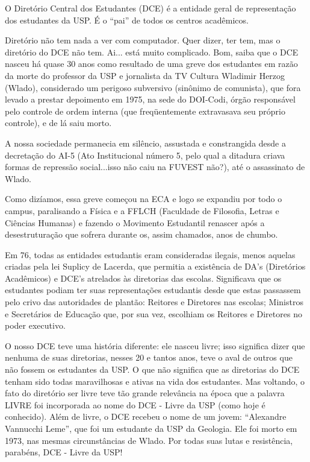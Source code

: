 \documentclass[11pt]{report}
\newenvironment{secao}[1] {
    \framebox[\textwidth] {
        \rule[-1.2ex]{5ex}{5.5ex}
        {\Large\sf #1}
        \hspace{\stretch{1}}
    } \addcontentsline{toc}{chapter}{#1}
    \nopagebreak[4]
} { 
}
\begin{document}
\begin{secao}{Um Pouco Sobre o DCE}


O Diretório Central dos Estudantes (DCE) é a entidade geral de representação
dos estudantes da USP. É o ``pai'' de todos os centros acadêmicos.

Diretório não tem nada a ver com computador. Quer dizer, ter tem, mas o
diretório do DCE não tem. Ai... está muito complicado. Bom, saiba que o DCE
nasceu há quase 30 anos como resultado de uma greve dos estudantes em
razão da morte do professor da USP e jornalista da TV Cultura Wladimir Herzog
(Wlado), considerado um perigoso subversivo (sinônimo de comunista), que fora
levado a prestar depoimento em 1975, na sede do DOI-Codi, órgão responsável
pelo controle de ordem interna (que freqüentemente extravasava seu próprio
controle), e de lá saiu morto.

A nossa sociedade permanecia em silêncio, assustada e constrangida desde a
decretação do AI-5 (Ato Institucional número 5, pelo qual a ditadura criava
formas de repressão social...isso não caiu na FUVEST não?), até o assassinato
de Wlado.

Como dizíamos, essa greve começou na ECA e logo se expandiu por todo o  campus,
paralisando a Física e a FFLCH (Faculdade de Filosofia, Letras e Ciências
Humanas) e fazendo o Movimento Estudantil renascer após a desestruturação que
sofrera durante os, assim chamados, anos de chumbo.

Em 76, todas as entidades estudantis eram consideradas ilegais, menos aquelas
criadas pela lei Suplicy de Lacerda, que permitia a existência de DA's
(Diretórios Acadêmicos) e DCE's atrelados às diretorias das escolas.
Significava que os estudantes podiam ter suas representações estudantis desde
que estas passassem pelo crivo das autoridades de plantão: Reitores e
Diretores nas escolas; Ministros e Secretários de Educação que, por sua vez,
escolhiam os Reitores e Diretores no poder executivo.

O nosso DCE teve uma história diferente: ele nasceu livre; isso significa dizer
que nenhuma de suas diretorias, nesses 20 e tantos anos, teve o aval de outros
que não fossem os estudantes da USP. O que não significa que as diretorias do DCE
tenham sido todas maravilhosas e ativas na vida dos estudantes. 
Mas voltando, o fato do diretório ser livre teve tão grande relevância na época
que a palavra LIVRE foi incorporada ao nome do DCE - Livre da USP (como hoje é
conhecido). Além de livre, o DCE recebeu o nome de um jovem: ``Alexandre Vannucchi Leme'',
que foi um estudante da USP da Geologia. Ele foi morto em 1973, nas mesmas
circunstâncias de Wlado. Por todas suas lutas e resistência, parabéns,
DCE - Livre da USP!

\end{secao}
\pagebreak
\end{document}
